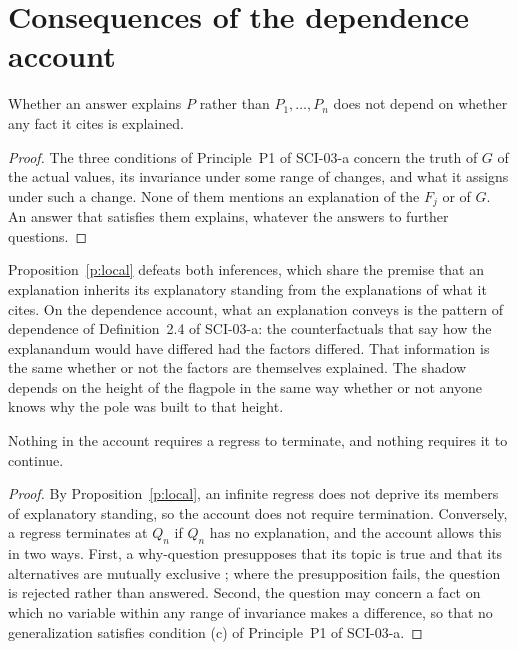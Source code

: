 \documentclass{situationist-preprint}
\begin{document}
\section{Consequences of the dependence account}\label{s:consequences}

\begin{proposition}[Locality]\label{p:local}
Whether an answer explains $P$ rather than $P_1, \dots, P_n$ does not depend on whether any fact it cites is explained.
\end{proposition}

\begin{proof}
The three conditions of Principle~P1 of SCI-03-a concern the truth of $G$ of the actual values, its invariance under some range of changes, and what it assigns under such a change. None of them mentions an explanation of the $F_j$ or of $G$. An answer that satisfies them explains, whatever the answers to further questions.
\end{proof}

Proposition~\ref{p:local} defeats both inferences, which share the premise that an explanation inherits its explanatory standing from the explanations of what it cites. On the dependence account, what an explanation conveys is the pattern of dependence of Definition~2.4 of SCI-03-a: the counterfactuals that say how the explanandum would have differed had the factors differed. That information is the same whether or not the factors are themselves explained. The shadow depends on the height of the flagpole in the same way whether or not anyone knows why the pole was built to that height.

\begin{proposition}\label{p:endless}
Nothing in the account requires a regress to terminate, and nothing requires it to continue.
\end{proposition}

\begin{proof}
By Proposition~\ref{p:local}, an infinite regress does not deprive its members of explanatory standing, so the account does not require termination. Conversely, a regress terminates at $Q_n$ if $Q_n$ has no explanation, and the account allows this in two ways. First, a why-question presupposes that its topic is true and that its alternatives are mutually exclusive \citep{vanFraassen1980}; where the presupposition fails, the question is rejected rather than answered. Second, the question may concern a fact on which no variable within any range of invariance makes a difference, so that no generalization satisfies condition (c) of Principle~P1 of SCI-03-a.
\end{proof}
\end{document}
